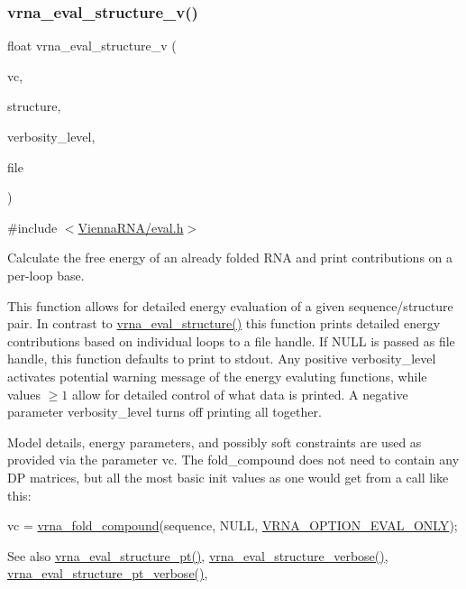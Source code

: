 \subsubsection{\texorpdfstring{vrna\+\_\+eval\+\_\+structure\+\_\+v()}{vrna\_eval\_structure\_v()}}
{\footnotesize\ttfamily float vrna\+\_\+eval\+\_\+structure\+\_\+v (\begin{DoxyParamCaption}\item[{\hyperlink{group__fold__compound_ga1b0cef17fd40466cef5968eaeeff6166}{vrna\+\_\+fold\+\_\+compound\+\_\+t} $\ast$}]{vc,  }\item[{const char $\ast$}]{structure,  }\item[{int}]{verbosity\+\_\+level,  }\item[{F\+I\+LE $\ast$}]{file }\end{DoxyParamCaption})}



{\ttfamily \#include $<$\hyperlink{eval_8h}{Vienna\+R\+N\+A/eval.\+h}$>$}



Calculate the free energy of an already folded R\+NA and print contributions on a per-\/loop base. 

This function allows for detailed energy evaluation of a given sequence/structure pair. In contrast to \hyperlink{group__eval_ga58f199f1438d794a265f3b27fc8ea631}{vrna\+\_\+eval\+\_\+structure()} this function prints detailed energy contributions based on individual loops to a file handle. If N\+U\+LL is passed as file handle, this function defaults to print to stdout. Any positive {\ttfamily verbosity\+\_\+level} activates potential warning message of the energy evaluting functions, while values $ \ge 1 $ allow for detailed control of what data is printed. A negative parameter {\ttfamily verbosity\+\_\+level} turns off printing all together.

Model details, energy parameters, and possibly soft constraints are used as provided via the parameter \textquotesingle{}vc\textquotesingle{}. The fold\+\_\+compound does not need to contain any DP matrices, but all the most basic init values as one would get from a call like this\+: 
\begin{DoxyCode}
vc = \hyperlink{group__fold__compound_ga6601d994ba32b11511b36f68b08403be}{vrna\_fold\_compound}(sequence, NULL, \hyperlink{group__fold__compound_ga61469c423131552c8483229f8b6c7e0e}{VRNA\_OPTION\_EVAL\_ONLY});
\end{DoxyCode}


\begin{DoxySeeAlso}{See also}
\hyperlink{group__eval_gadbd09372ddfd7a450bbd590c96a6bfe4}{vrna\+\_\+eval\+\_\+structure\+\_\+pt()}, \hyperlink{group__eval_ga0928d699d310178f84ee2351034e5cb5}{vrna\+\_\+eval\+\_\+structure\+\_\+verbose()}, \hyperlink{group__eval_ga8a517cfeeae8c376ae7b1e0c401d38b4}{vrna\+\_\+eval\+\_\+structure\+\_\+pt\+\_\+verbose()},
\end{DoxySeeAlso}

